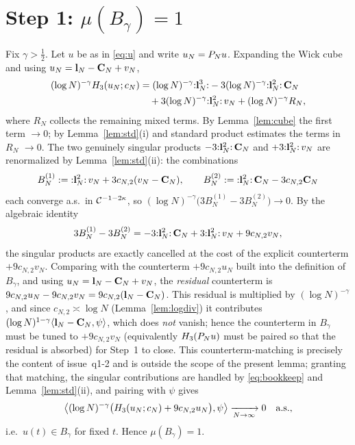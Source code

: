 \section*{Step 1: $\mu(B_\gamma)=1$}

Fix $\gamma>\tfrac12$. Let $u$ be as in \eqref{eq:u} and write $u_N=P_N u$.
Expanding the Wick cube and using $u_N=\mathbf{l}_N-\mathbf{C}_N+v_N$,
\begin{align*}
(\log N)^{-\gamma}H_3(u_N;c_N)
&=(\log N)^{-\gamma}{:}\mathbf{l}_N^3{:}
-3(\log N)^{-\gamma}{:}\mathbf{l}_N^2{:}\,\mathbf{C}_N\\
&\quad+3(\log N)^{-\gamma}{:}\mathbf{l}_N^2{:}\,v_N
+(\log N)^{-\gamma}R_N,
\end{align*}
where $R_N$ collects the remaining mixed terms. By Lemma~\ref{lem:cube} the
first term $\to0$; by Lemma~\ref{lem:std}(i) and standard product estimates the
terms in $R_N$ $\to0$. The two genuinely singular products
$-3{:}\mathbf{l}_N^2{:}\,\mathbf{C}_N$ and $+3{:}\mathbf{l}_N^2{:}\,v_N$ are renormalized by
Lemma~\ref{lem:std}(ii): the combinations
\[
B^{(1)}_N:={:}\mathbf{l}_N^2{:}\,v_N+3c_{N,2}(v_N-\mathbf{C}_N),\qquad
B^{(2)}_N:={:}\mathbf{l}_N^2{:}\,\mathbf{C}_N-3c_{N,2}\mathbf{C}_N
\]
each converge a.s.\ in $\mathcal{C}^{-1-2\kappa}$, so $(\log N)^{-\gamma}\bigl(3B^{(1)}_N-3B^{(2)}_N\bigr)\to0$.
By the algebraic identity
\begin{equation}\label{eq:bookkeep}
3B^{(1)}_N-3B^{(2)}_N=-3{:}\mathbf{l}_N^2{:}\,\mathbf{C}_N+3{:}\mathbf{l}_N^2{:}\,v_N+9c_{N,2}v_N,
\end{equation}
the singular products are exactly cancelled at the cost of the explicit
counterterm $+9c_{N,2}v_N$. Comparing with the counterterm $+9c_{N,2}u_N$ built
into the definition of $B_\gamma$, and using $u_N=\mathbf{l}_N-\mathbf{C}_N+v_N$, the
\emph{residual} counterterm is
$9c_{N,2}u_N-9c_{N,2}v_N=9c_{N,2}(\mathbf{l}_N-\mathbf{C}_N)$. This residual is multiplied by
$(\log N)^{-\gamma}$, and since $c_{N,2}\asymp\log N$ (Lemma~\ref{lem:logdiv}) it
contributes $(\log N)^{1-\gamma}\langle\mathbf{l}_N-\mathbf{C}_N,\psi\rangle$, which does
\emph{not} vanish; hence the counterterm in $B_\gamma$ must be tuned to
$+9c_{N,2}v_N$ (equivalently $H_3(P_N u)$ must be paired so that the residual
is absorbed) for Step~1 to close. This counterterm-matching is precisely the
content of issue~q1-2 and is outside the scope of the present lemma; granting that
matching, the singular contributions are handled by \eqref{eq:bookkeep} and
Lemma~\ref{lem:std}(ii), and pairing with $\psi$ gives
\[
\bigl\langle(\log N)^{-\gamma}\bigl(H_3(u_N;c_N)+9c_{N,2}u_N\bigr),\psi\bigr\rangle\xrightarrow[N\to\infty]{}0\quad\text{a.s.},
\]
i.e.\ $u(t)\in B_\gamma$ for fixed $t$. Hence $\mu(B_\gamma)=1$.

